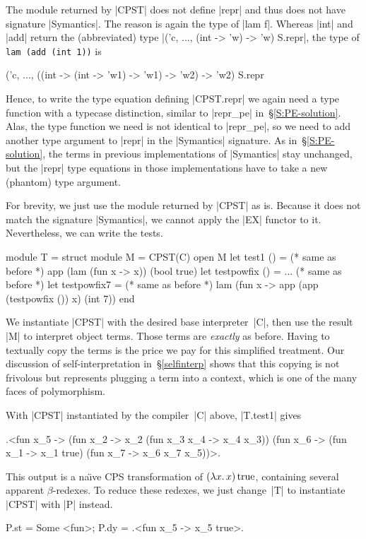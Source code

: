 The module returned by |CPST| does not define |repr|
and thus does not have signature |Symantics|.
The reason is again the type of |lam f|. Whereas
|int| and |add| return the (abbreviated) type
|('c, ..., (int -> 'w) -> 'w) S.repr|,
the type of \texttt{lam (add (int~1))} is
\begin{code}
('c, ..., ((int -> (int -> 'w1) -> 'w1) -> 'w2) -> 'w2) S.repr
\end{code}
Hence, to write the type equation defining |CPST.repr| we again need
a type function with a typecase distinction, similar to |repr_pe|
in~\S\ref{S:PE-solution}. Alas, the type function we need is not
identical to |repr_pe|, so we need to add another type argument to
|repr| in the |Symantics| signature. As in~\S\ref{S:PE-solution}, the
terms in previous implementations of |Symantics| stay unchanged, but the
|repr| type equations in those implementations have to take a new
(phantom) type argument.

For brevity, we just
use the module returned by |CPST| as is. Because it does not
match the signature |Symantics|, we cannot apply the |EX| functor to it.
Nevertheless, we can write the tests.
\begin{code}
module T = struct
  module M = CPST(C)
  open M
  let test1 () = (* same as before *)
       app (lam (fun x -> x)) (bool true)
  let testpowfix () = ... (* same as before *)
  let testpowfix7 = (* same as before *)
       lam (fun x -> app (app (testpowfix ()) x) (int 7))
end
\end{code}
We instantiate |CPST| with the desired base interpreter~|C|,
then use the result |M| to
interpret object terms. Those terms are \emph{exactly} as before.
Having to textually copy the terms is the
price we pay for this simplified treatment.
Our discussion of self\hyp interpretation in~\S\ref{selfinterp} shows
that this copying is not frivolous but represents plugging a term into
a context, which is one of the many faces of polymorphism.

With 
|CPST| instantiated by the compiler~|C| above,
|T.test1| gives
\begin{code}
.<fun x_5 -> (fun x_2 -> x_2 (fun x_3 x_4 -> x_4 x_3))
             (fun x_6 -> (fun x_1 -> x_1 true)
                         (fun x_7 -> x_6 x_7 x_5))>.
\end{code}
This output is a na\"{\i}ve CPS transformation of $(\mathopen{\lambda\mathord{x}.\,}x)\mathinner{\mathrm{true}}$,
containing several apparent $\beta$-redexes.  To reduce these
redexes, we just change~|T| to instantiate |CPST| with |P| instead.
\begin{code}
{P.st = Some <fun>; P.dy = .<fun x_5 -> x_5 true>.}
\end{code}

